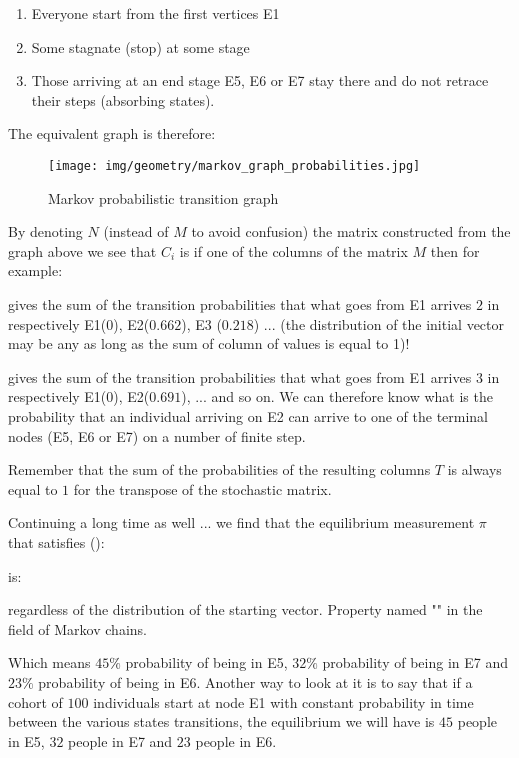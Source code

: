 {\begin{enumerate}
		\item Everyone start from the first vertices E1

		\item Some stagnate (stop) at some stage

		\item Those arriving at an end stage E5, E6 or E7 stay there and do not retrace their steps (absorbing states).
	\end{enumerate}
	The equivalent graph is therefore:
	\begin{figure}[H]
		\centering
		\texttt{[image: img/geometry/markov\_graph\_probabilities.jpg]}
		\caption[]{Markov probabilistic transition graph}
	\end{figure}
	By denoting $N$ (instead of $M$ to avoid confusion) the matrix constructed from the graph above we see that $C_i$ is if one of the columns of the matrix $M$ then for example:
	
	gives the sum of the transition probabilities that what goes from E1 arrives $2$ in respectively E1($0$), E2($0.662$), E3 ($0.218$) ... (the distribution of the initial vector may be any as long as the sum of column of values is equal to 1)!
	
	
	gives the sum of the transition probabilities that what goes from E1 arrives $3$ in respectively E1($0$), E2($0.691$), ... and so on. We can therefore know what is the probability that an individual arriving on E2 can arrive to one of the terminal nodes (E5, E6 or E7) on a number of finite step.

	\begin{tcolorbox}[title=Remark,colframe=black,arc=10pt]
	Remember that the sum of the probabilities of the resulting columns $T$ is always equal to $1$ for the transpose of the stochastic matrix.
	\end{tcolorbox}
	Continuing a long time as well ... we find that the equilibrium measurement $\pi$ that satisfies ():
	
	is:
	
	
	regardless of the distribution of the starting vector. Property named "" in the field of Markov chains.

	Which means $45\%$ probability of being in E5, $32\%$ probability of being in E7 and $23\%$ probability of being in E6. Another way to look at it is to say that if a cohort of $100$ individuals start at node E1 with constant probability in time between the various states transitions, the equilibrium we will have is $45$ people in E5, $32$ people in E7 and $23$ people in E6.

}
